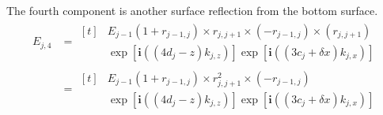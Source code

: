 \documentclass[../main.tex]{subfiles}
\begin{document}
	The fourth component is another surface reflection from the bottom surface.
	\begin{align}
		E_{j,4} &= 
			\begin{aligned}[t]
			&E_{j-1} 
			\left(1 + r_{j-1,j}\right) \times r_{j, j+1} \times (- r_{j-1,j}) \times (r_{j, j+1})\\
			&\exp\left[\mathbf{i}\left((4 d_{j} - z) k_{j,z}\right)\right]
			\exp\left[\mathbf{i}\left((3 c_{j} + \delta x) k_{j,x}\right)\right]
			\end{aligned}\\
			&= 
			\begin{aligned}[t]
			&E_{j-1} 
			\left(1 + r_{j-1,j}\right) \times r_{j, j+1}^2 \times (- r_{j-1,j})\\
			&\exp\left[\mathbf{i}\left((4 d_{j} - z) k_{j,z}\right)\right]
			\exp\left[\mathbf{i}\left((3 c_{j} + \delta x) k_{j,x}\right)\right]
			\end{aligned}
	\end{align}
\end{document}
